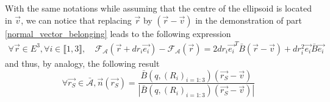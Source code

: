 \documentclass[class=report, float=false, crop=false]{standalone}
\begin{document}
With the same notations while assuming that the centre of the ellipsoid is located in $\vec{v}$, we can notice that replacing $\vec{r}$ by $(\vec{r} - \vec{v})$ in the demonstration of part \ref{normal_vector_belonging} leads to the following expression
\begin{align*}
\forall \vec{r} \in E^3, \forall i \in \llbracket1,3\rrbracket,~ &\mathcal{F}_{\mathcal{A}}(\vec{r} + dr_i\vec{e_i}) - \mathcal{F}_{\mathcal{A}}(\vec{r}) = 2dr_i\vec{e_i}^T\bar{B}(\vec{r} - \vec{v}) + dr_i^2\vec{e_i}\bar{B}\vec{e_i}
\end{align*}
and thus, by analogy, the following result
\begin{equation}
\boxed{\forall \vec{r_S}\in \bar{\mathcal{A}}, \vec{n}(\vec{r_S}) = \frac{\bar{B}(q,(R_i)_{i=1:3})(\vec{r_S} - \vec{v})}{|\bar{B}(q,(R_i)_{i=1:3})(\vec{r_S} - \vec{v})|}}
\label{surface_vec_reduced}
\end{equation}

% 
\end{document}
